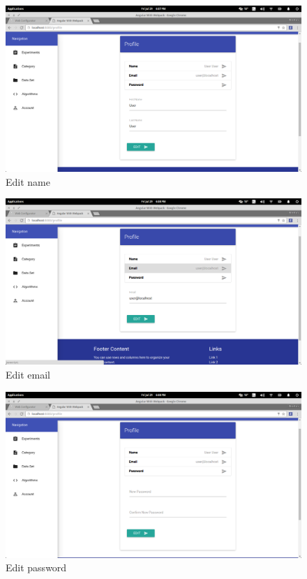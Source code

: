 \documentclass[11pt,a4paper]{article}
\begin{document}
\begin{figure}[H]
	\begin{center}
		\includegraphics[scale=0.6]{../Images/User Manual/Profile Page1.png}
		\caption{Edit name}
		\label{fig:ProfilePage1}
	\end{center}  
\end{figure}
\begin{figure}[H]
	\begin{center}
		\includegraphics[scale=0.6]{../Images/User Manual/Profile Page2.png}
		\caption{Edit email}
		\label{fig:ProfilePage2}
	\end{center}  
\end{figure}
\begin{figure}[H]
	\begin{center}
		\includegraphics[scale=0.6]{../Images/User Manual/Profile Page3.png}
		\caption{Edit password}
		\label{fig:ProfilePage3}
	\end{center}  
\end{figure}
\end{document}
